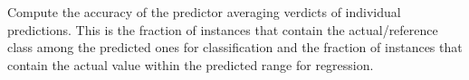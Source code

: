 \documentclass[letterpaper,10pt,english]{sphinxmanual}
\begin{document}
\begin{fulllineitems}
\begin{fulllineitems}
\end{fulllineitems}


\begin{fulllineitems}
\label{cp.evaluation:cp.evaluation.Results.accuracy}
Compute the accuracy of the predictor averaging verdicts of individual predictions. This is the fraction
of instances that contain the actual/reference class among the predicted ones for classification and the fraction of
instances that contain the actual value within the predicted range for regression.

\end{fulllineitems}


\begin{fulllineitems}
\label{cp.evaluation:cp.evaluation.Results.time}
\end{fulllineitems}


\end{fulllineitems}

\end{document}
